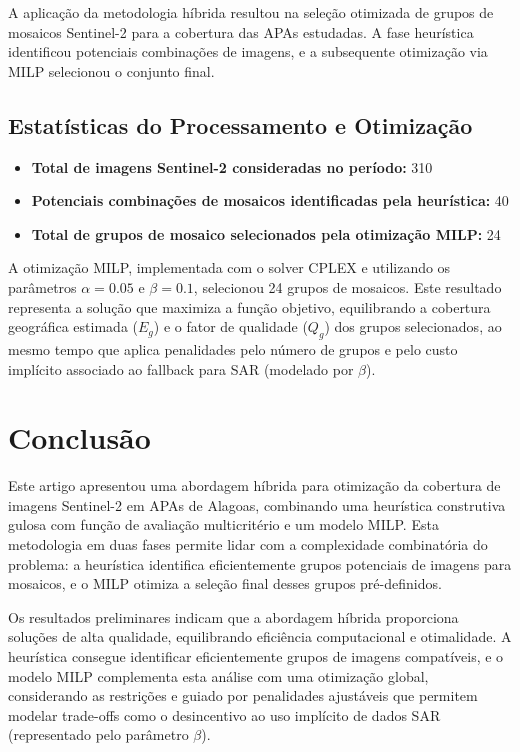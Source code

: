 \documentclass[a4paper,11pt]{article}
\begin{document}
A aplicação da metodologia híbrida resultou na seleção otimizada de grupos de mosaicos Sentinel-2 para a cobertura das APAs estudadas. A fase heurística identificou potenciais combinações de imagens, e a subsequente otimização via MILP selecionou o conjunto final.

\subsection{Estatísticas do Processamento e Otimização}
\begin{itemize}
    \item \textbf{Total de imagens Sentinel-2 consideradas no período:} 310
    \item \textbf{Potenciais combinações de mosaicos identificadas pela heurística:} 40
    \item \textbf{Total de grupos de mosaico selecionados pela otimização MILP:} 24
\end{itemize}

A otimização MILP, implementada com o solver CPLEX e utilizando os parâmetros $\alpha=0.05$ e $\beta=0.1$, selecionou 24 grupos de mosaicos. Este resultado representa a solução que maximiza a função objetivo, equilibrando a cobertura geográfica estimada ($E_g$) e o fator de qualidade ($Q_g$) dos grupos selecionados, ao mesmo tempo que aplica penalidades pelo número de grupos e pelo custo implícito associado ao fallback para SAR (modelado por $\beta$).

\section{Conclusão}
Este artigo apresentou uma abordagem híbrida para otimização da cobertura de imagens Sentinel-2 em APAs de Alagoas, combinando uma heurística construtiva gulosa com função de avaliação multicritério e um modelo MILP. Esta metodologia em duas fases permite lidar com a complexidade combinatória do problema: a heurística identifica eficientemente grupos potenciais de imagens para mosaicos, e o MILP otimiza a seleção final desses grupos pré-definidos.

Os resultados preliminares indicam que a abordagem híbrida proporciona soluções de alta qualidade, equilibrando eficiência computacional e otimalidade. A heurística consegue identificar eficientemente grupos de imagens compatíveis, e o modelo MILP complementa esta análise com uma otimização global, considerando as restrições e guiado por penalidades ajustáveis que permitem modelar trade-offs como o desincentivo ao uso implícito de dados SAR (representado pelo parâmetro $\beta$).
\end{document}
